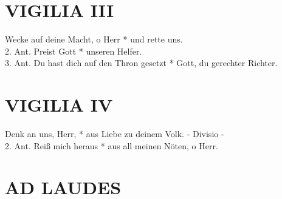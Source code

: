 \begin{flushleft}


\end{flushleft}


\section{VIGILIA III}

\begin{sloppypar}
{ Wecke auf deine Macht,  o Herr * und rette uns. \\
2. Ant. Preist Gott *  unseren Helfer. \\
3. Ant. Du hast dich auf den Thron gesetzt * Gott, du gerechter Richter.  \\}
\end{sloppypar}

\begin{flushleft}


\end{flushleft}

\section{VIGILIA IV}



\begin{sloppypar}
{  Denk an uns, Herr, * aus Liebe zu deinem Volk.   - Divisio -  \\
2. Ant. Reiß mich heraus * aus all meinen Nöten, o Herr. }\\ 

\end{sloppypar}

\begin{flushleft}


\end{flushleft}



\section[LAUDES]{AD LAUDES}

